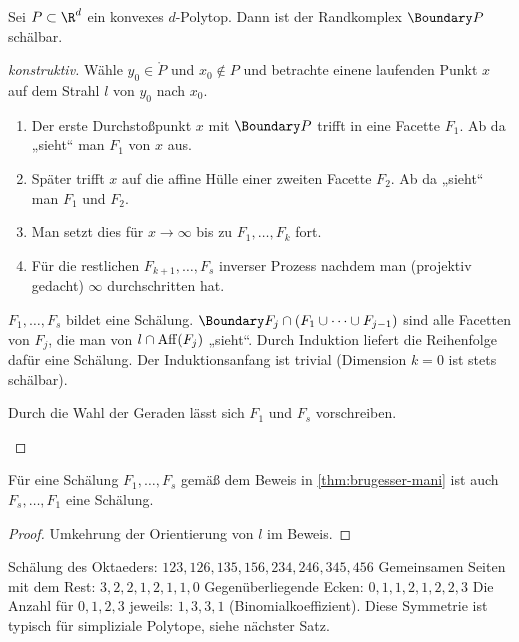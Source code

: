 \begin{st} \label{thm:brugesser-mani}
    Sei $P \subset \R^d$ ein konvexes $d$-Polytop.
    Dann ist der Randkomplex $\Boundary P$ schälbar.
    \begin{proof}[konstruktiv]
        Wähle $y_0 \in \mathring P$ und $x_0 \not\in P$ und betrachte einene laufenden Punkt $x$ auf dem Strahl $l$ von $y_0$ nach $x_0$.
        \begin{enumerate}[1.]
            \item
                Der erste Durchstoßpunkt $x$ mit $\Boundary P$ trifft in eine Facette $F_1$.
                Ab da „sieht“ man $F_1$ von $x$ aus.
            \item
                Später trifft $x$ auf die affine Hülle einer zweiten Facette $F_2$.
                Ab da „sieht“ man $F_1$ und $F_2$.
            \item
                Man setzt dies für $x \to \infty$ bis zu $F_1, \dotsc, F_k$ fort.
            \item
                Für die restlichen $F_{k+1}, \dotsc, F_s$ inverser Prozess nachdem man (projektiv gedacht) $\infty$ durchschritten hat.
        \end{enumerate}
        $F_1, \dotsc, F_s$ bildet eine Schälung.
        $\Boundary F_j \cap (F_1 \cup \dotsb \cup F_{j-1})$ sind alle Facetten von $F_j$, die man von $l \cap \operatorname { Aff }(F_j)$ „sieht“. 
        Durch Induktion liefert die Reihenfolge dafür eine Schälung.
        Der Induktionsanfang ist trivial (Dimension $k = 0$ ist stets schälbar).
        \begin{note}
            Durch die Wahl der Geraden lässt sich $F_1$ und $F_s$ vorschreiben.
        \end{note}
    \end{proof}
\end{st}

\begin{kor}
    Für eine Schälung $F_1, \dotsc, F_s$ gemäß dem Beweis in \ref{thm:brugesser-mani} ist auch $F_s, \dotsc, F_1$ eine Schälung.
    \begin{proof}
        Umkehrung der Orientierung von $l$ im Beweis.
    \end{proof}
\end{kor}

\begin{ex}
    Schälung des Oktaeders:
    \begin{math}
        123, 126, 135, 156, 234, 246, 345, 456
    \end{math}
    Gemeinsamen Seiten mit dem Rest:
    \begin{math}
        3, 2, 2, 1, 2, 1, 1, 0
    \end{math}
    Gegenüberliegende Ecken:
    \begin{math}
        0, 1, 1, 2, 1, 2, 2, 3
    \end{math}
    Die Anzahl für $0, 1, 2, 3$ jeweils: $1, 3, 3, 1$ (Binomialkoeffizient).
    Diese Symmetrie ist typisch für simpliziale Polytope, siehe nächster Satz.
\end{ex}

